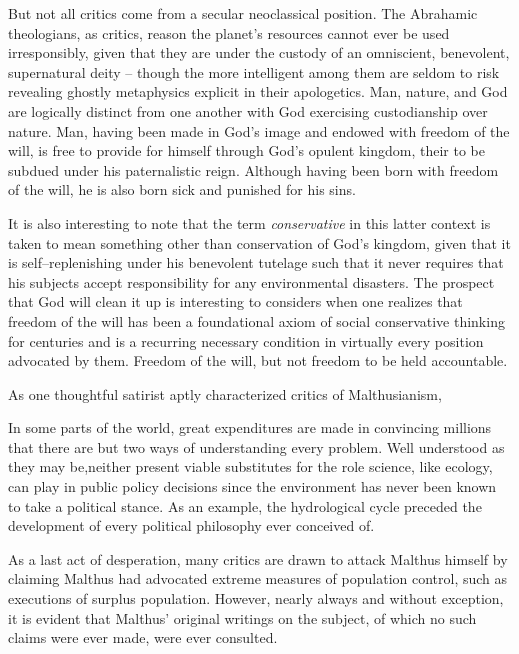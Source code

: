 But not all critics come from a secular neoclassical position. The Abrahamic theologians, as critics, reason the planet's resources cannot ever be used irresponsibly, given that they are under the custody of an omniscient, benevolent,  supernatural deity -- though the more intelligent among them are seldom to risk revealing ghostly metaphysics explicit in their apologetics. Man, nature, and God are logically distinct from one another with God exercising custodianship over nature. Man, having been made in God's image and endowed with freedom of the will, is free to provide for himself through God's opulent kingdom, their to be subdued under his paternalistic reign. Although having been born with freedom of the will, he is also born sick and punished for his sins.

It is also interesting to note that the term {\it conservative} in this latter context is taken to mean something other than conservation of God's kingdom, given that it is self--replenishing under his benevolent tutelage such that it never requires that his subjects accept responsibility for any environmental disasters. The prospect that God will clean it up is interesting to considers when one realizes that freedom of the will has been a foundational axiom of social conservative thinking for centuries and is a recurring necessary condition in virtually every position advocated by them. Freedom of the will, but not freedom to be held accountable.

As one thoughtful satirist aptly characterized critics of Malthusianism,   

In some parts of the world, great expenditures are made in convincing millions that there are but two ways of understanding every problem. Well understood as they may be,\footnotecite[goodnight1980] neither present viable substitutes for the role science, like ecology, can play in public policy decisions since the environment has never been known to take a political stance. As an example, the hydrological cycle preceded the development of every political philosophy ever conceived of.

As a last act of desperation, many critics are drawn to attack Malthus himself by claiming Malthus had advocated extreme measures of population control, such as executions of surplus population. However, nearly always and without exception, it is evident that Malthus' original writings on the subject, of which no such claims were ever made, were ever consulted.

